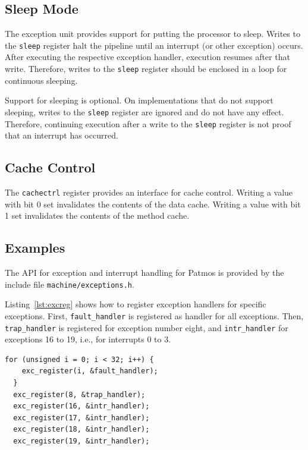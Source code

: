 \documentclass[a4paper,fontsize=10pt,twoside,DIV15,BCOR12mm,headinclude=true,footinclude=false,pagesize,bibtotoc]{scrbook}
\begin{document}
\subsection{Sleep Mode}

The exception unit provides support for putting the processor to
sleep. Writes to the \texttt{sleep} register halt the pipeline until
an interrupt (or other exception) occurs. After executing the
respective exception handler, execution resumes after that
write. Therefore, writes to the \texttt{sleep} register should be
enclosed in a loop for continuous sleeping.

Support for sleeping is optional. On implementations that do not
support sleeping, writes to the \texttt{sleep} register are ignored
and do not have any effect. Therefore, continuing execution after a
write to the \texttt{sleep} register is not proof that an interrupt
has occurred.

\subsection{Cache Control}

The \texttt{cachectrl} register provides an interface for cache
control. Writing a value with bit 0 set invalidates the contents of
the data cache. Writing a value with bit 1 set invalidates the
contents of the method cache.

\subsection{Examples}

The API for exception and interrupt handling for Patmos is provided by
the include file \texttt{machine/exceptions.h}.

Listing~\ref{lst:excreg} shows how to register exception handlers for
specific exceptions. First, \texttt{fault\_handler} is registered as
handler for all exceptions. Then, \texttt{trap\_handler} is registered
for exception number eight, and \texttt{intr\_handler} for exceptions
16 to 19, i.e., for interrupts 0 to 3.

\begin{lstlisting}[float, caption={Exception handler registration\label{lst:excreg}}]
  for (unsigned i = 0; i < 32; i++) {
	exc_register(i, &fault_handler);
  }
  exc_register(8, &trap_handler);
  exc_register(16, &intr_handler);
  exc_register(17, &intr_handler);
  exc_register(18, &intr_handler);
  exc_register(19, &intr_handler);
\end{lstlisting}
\end{document}
